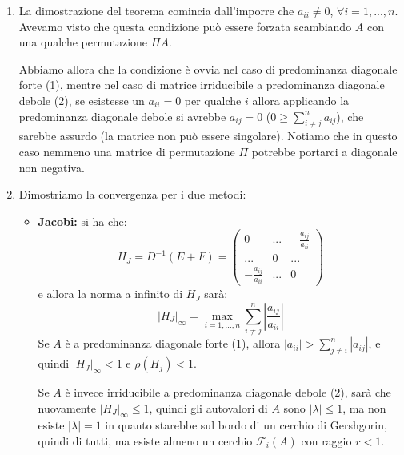 \documentclass[a4paper,11pt]{article}
\begin{document}
\begin{enumerate}
	\item 
La dimostrazione del teorema comincia dall'imporre che $a_{ii} \neq 0$, $\forall i = 1, ..., n$.
Avevamo visto che questa condizione può essere forzata scambiando $A$ con una qualche permutazione $\Pi A$.

Abbiamo allora che la condizione è ovvia nel caso di predominanza diagonale forte (1), mentre nel caso di matrice irriducibile a predominanza diagonale debole (2), se esistesse un $a_{ii} = 0$ per qualche $i$ allora applicando la predominanza diagonale debole si avrebbe $a_{ij} = 0$ ($0 \geq \sum_{i \neq j}^n a_{ij}$), che sarebbe assurdo (la matrice non può essere singolare).
Notiamo che in questo caso nemmeno una matrice di permutazione $\Pi$ potrebbe portarci a diagonale non negativa.

	\item 
Dimostriamo la convergenza per i due metodi:
\begin{itemize}
\item \textbf{Jacobi:} si ha che:
$$
H_J = D^{-1}(E + F) = \begin{pmatrix}
	0 & ... & -\frac{a_{ij}}{a_{ii}} \\ 
	... & 0 & ... \\ 
	-\frac{a_{ij}}{a_{ii}} & ... & 0
\end{pmatrix}
$$
e allora la norma a infinito di $H_J$ sarà:
$$
|H_J|_{\infty} = \max_{i = 1, ..., n} \sum_{i \neq j}^n \left|\frac{a_{ij}}{a_{ii}}\right|
$$
Se $A$ è a predominanza diagonale forte (1), allora $|a_{ii}| > \sum_{j \neq i}^n |a_{ij}|$, e quindi $|H_J|_\infty < 1$ e $\rho(H_j) < 1$.

Se $A$ è invece irriducibile a predominanza diagonale debole (2), sarà che nuovamente $|H_J|_\infty \leq 1$, quindi gli autovalori di $A$ sono $|\lambda| \leq 1$, ma non esiste $|\lambda| = 1$ in quanto starebbe sul bordo di un cerchio di Gershgorin, quindi di tutti, ma esiste almeno un cerchio $\mathcal{F}_i(A)$ con raggio $r < 1$. 


\end{itemize}
\end{enumerate}
\end{document}
